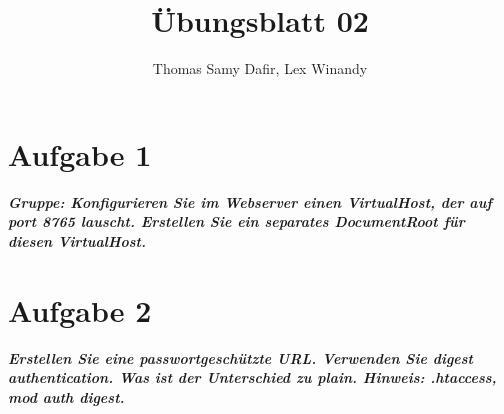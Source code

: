 \documentclass[12pt, a4paper]{report}
\title{Übungsblatt 02}
\author{Thomas Samy Dafir, Lex Winandy}
\date{}
\begin{document}
\maketitle

\section*{Aufgabe 1}
\textbf{\textit{Gruppe: Konfigurieren Sie im Webserver einen VirtualHost, der auf port 8765 lauscht.
Erstellen Sie ein separates DocumentRoot für diesen VirtualHost.}}


\section*{Aufgabe 2}
\textbf{\textit{Erstellen Sie eine passwortgeschützte URL. Verwenden Sie digest authentication. Was ist
der Unterschied zu plain. Hinweis: .htaccess, mod auth digest.}}\\
\end{document}
